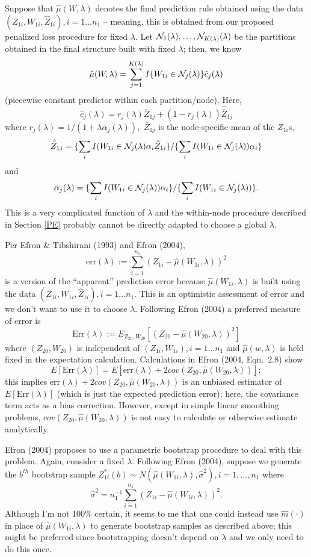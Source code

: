 \documentclass[12pt]{article}
\begin{document}
Suppose that $\hat{\mu}(W,\lambda)$ denotes the final prediction
rule obtained using the data $(Z_{1i}, W_{1i}, \hat Z_{1i}), i = 1
\ldots n_1$ -- meaning, this is obtained from our proposed
penalized loss procedure for fixed $\lambda.$
Let ${\cal N}_1(\lambda), \ldots, {\cal N}_{K(\lambda)}(\lambda)$ be the
partitions obtained in the final structure built with fixed $\lambda$; 
then, we know
\[
\hat{\mu}(W,\lambda) = \sum_{j=1}^{K(\lambda)} I\{W_{1i} \in {\cal
  N}_j(\lambda)\} \hat c_j(\lambda)
\]
(piecewise constant predictor within each partition/node).  Here,
 \[
\hat{c}_{j}(\lambda) =
r_{j}(\lambda) \bar{Z}_{1j} + (1-r_j(\lambda)) \hat{\bar{Z}}_{1j}
\]
where $r_j(\lambda) = 1/(1 + \lambda \bar{\alpha}_j(\lambda)),$ 
$\bar{Z}_{1j}$ is the node-specific mean
of the $Z_{1i}$s,
\[
\hat{\bar{Z}}_{1j}=
\{ \sum_i I(W_{1i} \in {\cal N}_j(\lambda) \alpha_i  \widehat{Z}_{1i}  \}
/ \{ \sum_i I(W_{1i} \in {\cal N}_j(\lambda)) \alpha_i \}
\]
and
\[
\bar{\alpha}_{j}(\lambda) =  \{ \sum_i I(W_{1i} \in  {\cal N}_j(\lambda)) \alpha_i \} /
\{ \sum_i I(W_{1i} \in  {\cal N}_j(\lambda))  \}. 
\]
This is a very complicated function of $\lambda$ and the within-node
procedure described in Section \ref{PE} probably cannot be directly
adapted to choose a global $\lambda$.

Per Efron \& Tibshirani (1993) and Efron (2004), 
\[
\mbox{err}(\lambda) := \sum_{i=1}^{n_1} ( Z_{1i} - \hat{\mu}(W_{1i},\lambda))^2
\]
is a version of the ``apparent'' prediction error because
$\hat{\mu}(W_{1i},\lambda)$ is built using the data $(Z_{1i}, W_{1i},
\hat Z_{1i}), i = 1 \ldots n_1.$ This is an optimistic assessment of
error and we don't want to use it to choose $\lambda$.  Following
Efron (2004) a preferred measure of error is
\[
\mbox{Err}(\lambda) := 
E_{Z_{20},W_{20}}\left[ (Z_{20} - \hat{\mu}(W_{20},\lambda))^2 \right]
\]
where $(Z_{20},W_{20})$ is independent of 
$(Z_{1i}, W_{1i}), i = 1 \ldots n_1$ and 
$\hat{\mu}(w,\lambda)$ is held fixed in the expectation
calculation.
Calculations in Efron (2004, Eqn.\ 2.8) show
\[
E[ \mbox{Err}(\lambda) ]
= E[ \mbox{err}(\lambda) + 2 cov(Z_{20},\hat{\mu}(W_{20},\lambda))];
\]
this implies $\mbox{err}(\lambda) + 2
cov(Z_{20},\hat{\mu}(W_{20},\lambda))$ is an unbiased estimator of $E[
  \mbox{Err}(\lambda) ]$ (which is just the expected prediction
error); here, the covariance term acts as a bias correction. However,
except in simple linear smoothing problems,
$cov(Z_{20},\hat{\mu}(W_{20},\lambda))$ is not easy to calculate or
otherwise estimate analytically.

Efron (2004) proposes to use a parametric bootstrap procedure to deal
with this problem. Again, consider a fixed $\lambda$.  Following Efron
(2004), suppose we generate the $b^{th}$ bootstrap sample $Z_{1i}^*(b)
\sim N( \hat \mu(W_{1i},\lambda), \hat \sigma^2 ), i = 1, \ldots, n_1$
where
\[
\hat \sigma^2 = n_1^{-1} \sum_{i=1}^{n_1} (Z_{1i}-\hat \mu(W_{1i},\lambda))^2.
\]
Although I'm not 100\% certain, it seems to me that one could instead
use $\hat m(\cdot)$ in place of $\hat \mu(W_{1i},\lambda)$ to generate
bootstrap samples as described above; this might be preferred since
bootstrapping doesn't depend on $\lambda$ and we only need to do this
once.
\end{document}
